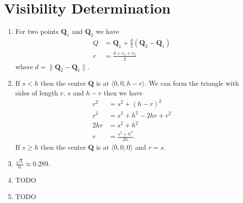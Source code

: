 \documentclass[a4paper]{report}
\begin{document}
\chapter{Visibility Determination}
\begin{enumerate}
	\item For two points $\mathbf{Q}_1$ and $\mathbf{Q}_2$ we have
		\begin{align*}
			Q &= \mathbf{Q}_1 + \frac{d}{2}(\mathbf{Q}_2 - \mathbf{Q}_1)\\
			r &= \frac{d + r_1 + r_2}{2}
		\end{align*}
		where $d = \lVert \mathbf{Q}_2 - \mathbf{Q}_1 \rVert$.
	\item If $s < h$ then the center $\mathbf{Q}$ is at $\langle 0, 0, h - r \rangle$. We can form the triangle
		with sides of length $r$, $s$ and $h - r$ then we have
		\begin{align*}
			r^2 &= s^2 + {(h - r)}^2\\
			r^2 &= s^2 + h^2 - 2hr + r^2\\
			2hr &= s^2 + h^2\\
			r &= \frac{s^2 + h^2}{2h}.
		\end{align*}
		If $s \geq h$ then the center $\mathbf{Q}$ is at $\langle 0, 0, 0 \rangle$ and $r = s$.
	\item $\frac{\sqrt{3}}{6} \approx 0.289$.
	\item TODO
	\item TODO
\end{enumerate}
\end{document}

